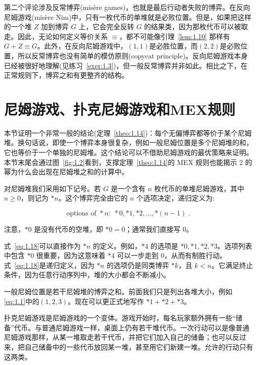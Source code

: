 第二个评论涉及反常博弈(misère games)，也就是最后行动者失败的博弈。在反向尼姆游戏(misère Nim)中，只有一枚代币的单堆就是必败位置。但是，如果把这样的一个堆 \(Z\) 加到博弈 \(G\) 上，它会完全反转 \(G\) 的结果类，因为那枚代币可以被取走。因此，无论如何定义等价关系 \(\equiv\)，都不可能像引理~\ref{lem:1.10} 那样有 \(G+Z\equiv G\)。此外，在反向尼姆游戏中，$(1,1)$是必胜位置，而$(2,2)$是必败位置，所以反常博弈也没有简单的模仿原则(copycat principle)。反向尼姆游戏本身已经被很好地理解(见练习~\ref{exer:1.3})，但一般反常博弈并非如此。相比之下，在正常规则下，博弈之和有更整齐的结构。

\section{ 尼姆游戏、扑克尼姆游戏和MEX规则}\label{sec-1.5}

本节证明一个非常一般的结论(定理~\ref{theo:1.14})：每个无偏博弈都等价于某个尼姆堆。换句话说，即使一个博弈本身很复杂，例如一般尼姆位置是多个尼姆堆的和，它也等价于一个单独的尼姆堆。这个结论可以不借助尼姆游戏的最优策略来证明。本节末尾会通过图~\ref{fig:1.2}看到，支撑定理~\ref{theo:1.14}的 MEX 规则也能揭示 2 的幂为什么会出现在尼姆堆之和的计算中。

对尼姆堆我们采用如下记号。若 \(G\) 是一个含有 \(n\) 枚代币的单堆尼姆游戏，其中 \(n\geq 0\)，则记为 \(*n\)。这个博弈完全由它的 \(n\) 个选项决定，递归定义为:

\begin{equation}
\text{ options of } * n : \; * 0, * 1, * 2,\ldots , * \left( {n - 1}\right) \text{ . }  \label{eq:1.18}
\end{equation}

注意，\(*0\) 是没有代币的空堆，即 \(*0=0\)；通常我们直接写 0。

式~\eqref{eq:1.18}可以直接作为 \(*n\) 的定义。例如，\(*4\) 的选项是 \(*0,*1,*2,*3\)。选项列表中包含 \(*0\) 很重要，因为这意味着 \(*4\) 可以一步走到 0，从而有制胜行动。式~\eqref{eq:1.18}是递归定义，因为 \(*n\) 的选项仍是同类博弈 \(*k\)，且 \(k<n\)。它满足终止条件，因为任意行动序列中，堆的大小都会不断减小。

一般尼姆位置是若干尼姆堆的博弈之和。前面我们只是列出各堆大小，例如\eqref{eq:1.1}中的$(1,2,3)$。现在可以更正式地写作 \(*1+*2+*3\)。

扑克尼姆游戏是尼姆游戏的一个变体。游戏开始时，每名玩家额外拥有一些“储备”代币。与普通尼姆游戏一样，桌面上仍有若干堆代币。一次行动可以是像普通尼姆游戏那样，从某一堆取走若干代币，并把它们加入自己的储备；也可以反过来，把自己储备中的一些代币放回某一堆，甚至用它们新建一堆。允许的行动只有这两类。

